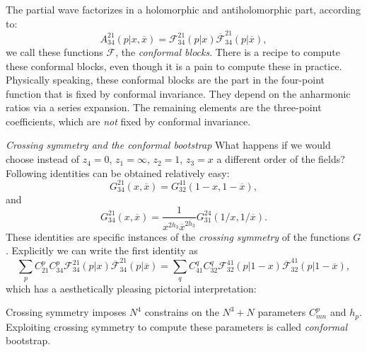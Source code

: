 \documentclass[submission, PhysLectNotes]{SciPost}
\begin{document}
The partial wave factorizes in a holomorphic and antiholomorphic part, according to:
\begin{equation}
	A_{34}^{21}(p|x,\overline{x}) = \mathcal{F}_{34}^{21}(p|x)\overline{\mathcal{F}}_{34}^{21}(p|\overline{x}),
\end{equation}
we call these functions $\mathcal{F}$, the \emph{conformal blocks}. There is a recipe to compute these conformal blocks, even though it is a pain to compute these in practice. Physically speaking, these conformal blocks are the part in the four-point function that is fixed by conformal invariance. They depend on the anharmonic ratios via a series expansion. The remaining elements are the three-point coefficients, which are \emph{not} fixed by conformal invariance.

{\it Crossing symmetry and the conformal bootstrap}
What happens if we would choose instead of $z_4 = 0$, $z_1 = \infty$, $z_2 = 1$, $z_3 = x$ a different order of the fields? Following identities can be obtained relatively easy:
\begin{equation}
	G_{34}^{21}(x,\overline{x}) = G_{32}^{41}(1-x,1-\overline{x}),
\end{equation}
and
\begin{equation}
	G_{34}^{21}(x,\overline{x}) = \frac{1}{x^{2h_3}\overline{x}^{2\overline{h}_3}}G_{31}^{24}(1/x,1/\overline{x}).
\end{equation}
These identities are specific instances of the \emph{crossing symmetry} of the functions $G$. Explicitly we can write the first identity as
\begin{equation}
	\sum_p C_{21}^pC_{34}^p\mathcal{F}_{34}^{21}(p|x)\overline{\mathcal{F}}_{34}^{21}(p|\overline{x}) = \sum_q C_{41}^q C_{32}^q \mathcal{F}_{32}^{41}(p|1-x)\overline{\mathcal{F}}_{32}^{41}(p|1-\overline{x}),
\end{equation}
which has a aesthetically pleasing pictorial interpretation:
\begin{figure}
\centering
{}
\end{figure}
Crossing symmetry imposes $N^4$ constrains on the $N^3 + N$ parameters $C_{mn}^p$ and $h_p$. Exploiting crossing symmetry to compute these parameters is called \emph{conformal} bootstrap.
\end{document}

